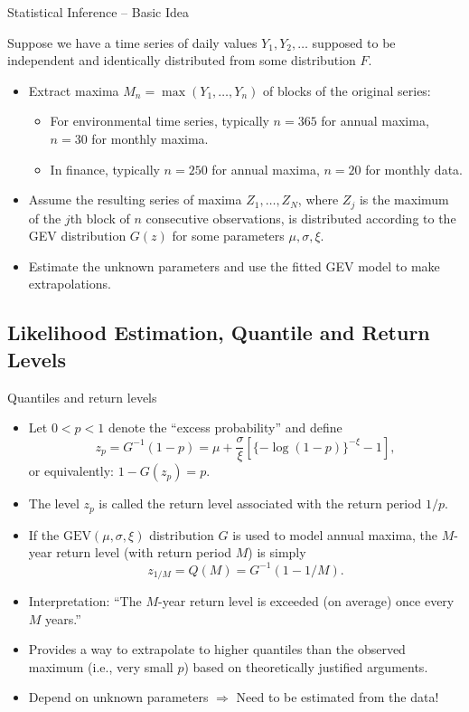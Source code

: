 \documentclass[10pt, hyperref={colorlinks = true,linkcolor = blue}]{beamer}
\begin{document}
{{\begin{frame}{Statistical Inference -- Basic Idea}

Suppose we have a time series of daily values $Y_1, Y_2, \ldots$ supposed to be independent and identically distributed from some distribution $F$.

\begin{itemize}
    \item Extract maxima $M_n = \max(Y_1, \ldots, Y_n)$ of blocks of the original series:
    \begin{itemize}
        \item For environmental time series, typically $n = 365$ for annual maxima, $n = 30$ for monthly maxima.
        \item In finance, typically $n = 250$ for annual maxima, $n = 20$ for monthly data.
    \end{itemize}
    \item Assume the resulting series of maxima $Z_1, \ldots, Z_N$, where $Z_j$ is the maximum of the $j$th block of $n$ consecutive observations, is distributed according to the GEV distribution $G(z)$ for some parameters $\mu, \sigma, \xi$.
    \item Estimate the unknown parameters and use the fitted GEV model to make extrapolations.
\end{itemize}

\end{frame}

}

{\subsection{Likelihood Estimation, Quantile and Return Levels}
\begin{frame}{Quantiles and return levels}
\begin{itemize}
    \item Let $0 < p < 1$ denote the “excess probability” and define
    \[
    z_p = G^{-1}(1 - p) = \mu + \frac{\sigma}{\xi} \left[ \{-\log(1 - p)\}^{-\xi} - 1 \right],
    \]
    or equivalently: $1 - G(z_p) = p$.
    \item The level $z_p$ is called the return level associated with the return period $1/p$.
    \item If the $\text{GEV}(\mu, \sigma, \xi)$ distribution $G$ is used to model annual maxima, the $M$-year return level (with return period $M$) is simply
    \[
    z_{1/M} = Q(M) = G^{-1}(1 - 1/M).
    \]
    \item Interpretation: “The $M$-year return level is exceeded (on average) once every $M$ years.”
    \item Provides a way to extrapolate to higher quantiles than the observed maximum (i.e., very small $p$) based on theoretically justified arguments.
    \item Depend on unknown parameters $\Rightarrow$ Need to be estimated from the data!
\end{itemize}
\end{frame}

}}
\end{document}
